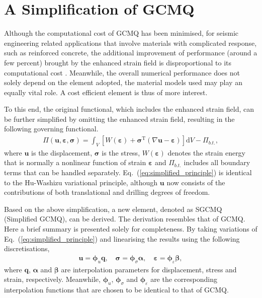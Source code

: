 \documentclass[3p,sort&compress,review,11pt,fleqn]{elsarticle}
\newcommand*{\md}[1]{\mathrm{d}#1}
\newcommand*{\mT}{\mathrm{T}}
\newcommand*{\eqsref}[1]{Eq.~(\ref{#1})}
\newcommand*{\mathbold}[1]{\bm{#1}}
\begin{document}
\section{A Simplification of GCMQ}
Although the computational cost of GCMQ has been minimised, for seismic engineering related applications that involve materials with complicated response, such as reinforced concrete, the additional improvement of performance (around a few percent) brought by the enhanced strain field is disproportional to its computational cost \citep[see][for cost estimation]{Chang2020}. Meanwhile, the overall numerical performance does not solely depend on the element adopted, the material models used may play an equally vital role. A cost efficient element is thus of more interest.

To this end, the original functional, which includes the enhanced strain field, can be further simplified by omitting the enhanced strain field, resulting in the following governing functional.
\begin{gather}\label{eq:simplified_principle}
\varPi\left(\mathbold{u},\mathbold{\varepsilon},\mathbold{\sigma}\right)=\int_V\left[W\left(\mathbold{\varepsilon}\right)+\mathbold{\sigma}^\mT\left(\nabla\mathbold{u}-\mathbold{\varepsilon}\right)\right]\md{V}-\varPi_{b.t.},
\end{gather}
where $\mathbold{u}$ is the displacement, $\mathbold{\sigma}$ is the stress, $W\left(\mathbold{\varepsilon}\right)$ denotes the strain energy that is normally a nonlinear function of strain $\mathbold{\varepsilon}$ and $\varPi_{b.t.}$ includes all boundary terms that can be handled separately. \eqsref{eq:simplified_principle} is identical to the Hu-Washizu variational principle, although $\mathbold{u}$ now consists of the contributions of both translational and drilling degrees of freedom.

Based on the above simplification, a new element, denoted as SGCMQ (Simplified GCMQ), can be derived. The derivation resembles that of GCMQ. Here a brief summary is presented solely for completeness. By taking variations of \eqsref{eq:simplified_principle} and linearising the results using the following discretisations,
\begin{gather*}
\mathbold{u}=\mathbold{\phi}_u\mathbold{q},\quad
\mathbold{\sigma}=\mathbold{\phi}_\sigma\mathbold{\alpha},\quad
\mathbold{\varepsilon}=\mathbold{\phi}_\varepsilon\mathbold{\beta},
\end{gather*}
where $\mathbold{q}$, $\mathbold{\alpha}$ and $\mathbold{\beta}$ are interpolation parameters for displacement, stress and strain, respectively. Meanwhile, $\mathbold{\phi}_u$, $\mathbold{\phi}_\sigma$ and $\mathbold{\phi}_\varepsilon$ are the corresponding interpolation functions that are chosen to be identical to that of GCMQ.
\end{document}
